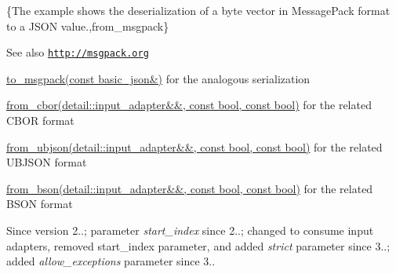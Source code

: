 \{The example shows the deserialization of a byte vector in Message\+Pack format to a J\+S\+ON value.,from\+\_\+msgpack\}

\begin{DoxySeeAlso}{See also}
\href{http://msgpack.org}{\tt http\+://msgpack.\+org} 

\hyperlink{classnlohmann_1_1basic__json_a09ca1dc273d226afe0ca83a9d7438d9c}{to\+\_\+msgpack(const basic\+\_\+json\&)} for the analogous serialization 

\hyperlink{classnlohmann_1_1basic__json_a1d568ba1bd6978d80db42aa76626e2cf}{from\+\_\+cbor(detail\+::input\+\_\+adapter\&\&, const bool, const bool)} for the related C\+B\+OR format 

\hyperlink{classnlohmann_1_1basic__json_a1ed52b463d2ef14c85ed076467168c72}{from\+\_\+ubjson(detail\+::input\+\_\+adapter\&\&, const bool, const bool)} for the related U\+B\+J\+S\+ON format 

\hyperlink{classnlohmann_1_1basic__json_a0524486cd0b36a47448df882ec0d5e7b}{from\+\_\+bson(detail\+::input\+\_\+adapter\&\&, const bool, const bool)} for the related B\+S\+ON format
\end{DoxySeeAlso}
\begin{DoxySince}{Since}
version 2..; parameter {\itshape start\+\_\+index} since 2..; changed to consume input adapters, removed start\+\_\+index parameter, and added {\itshape strict} parameter since 3..; added {\itshape allow\+\_\+exceptions} parameter since 3.. 
\end{DoxySince}
